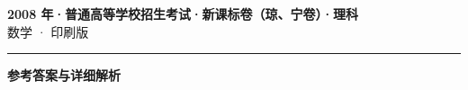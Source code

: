 \documentclass[zihao=5, a4paper]{ctexart}
\begin{document}
\begin{center}
  {\Large\bfseries 2008 年·普通高等学校招生考试·新课标卷（琼、宁卷）·理科}\\[4pt]
  {\large 数学 · 印刷版}
\end{center}
\medskip
{}

\par\bigskip\hrule\bigskip
{}
\begin{center}{\large\bfseries 参考答案与详细解析}\end{center}
\smallskip

\end{document}

